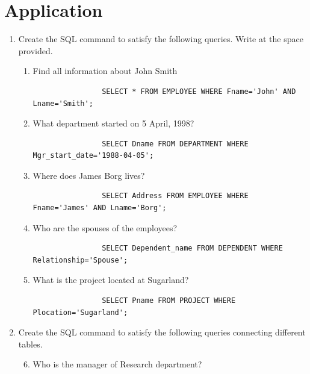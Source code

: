 \documentclass[12pt,titlepage]{article}
\begin{document}
\section{Application}
\begin{enumerate}[label=\Alph*.]
    \item {
        Create the SQL command to satisfy the following queries. Write at the space provided.

        \begin{enumerate}[label={\arabic*.}]
            \item {
                Find all information about John Smith

                \begin{verbatim}
                SELECT * FROM EMPLOYEE WHERE Fname='John' AND Lname='Smith';
                \end{verbatim}
            }
            \item {
                What department started on 5 April, 1998?

                \begin{verbatim}
                SELECT Dname FROM DEPARTMENT WHERE Mgr_start_date='1988-04-05';
                \end{verbatim}
            }   
            \item {
                Where does James Borg lives?

                \begin{verbatim}
                SELECT Address FROM EMPLOYEE WHERE Fname='James' AND Lname='Borg';
                \end{verbatim}
            }
            \item {
                Who are the spouses of the employees?

                \begin{verbatim}
                SELECT Dependent_name FROM DEPENDENT WHERE Relationship='Spouse';
                \end{verbatim}
            }
            \item {
                What is the project located at Sugarland?

                \begin{verbatim}
                SELECT Pname FROM PROJECT WHERE Plocation='Sugarland';
                \end{verbatim}
            }
        \end{enumerate}
    }
    \item {
        Create the SQL command to satisfy the following queries connecting different tables.
        \begin{enumerate}[label={\arabic*.}]
            \setcounter{enumii}{5}
            \item {
                Who is the manager of Research department?

}
\end{enumerate}}
\end{enumerate}
\end{document}
